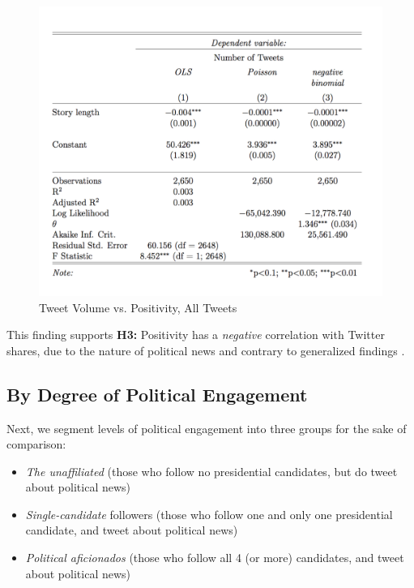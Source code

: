 \documentclass[letterpaper]{article}
\begin{document}
\begin{figure}[t!]  
\centering 
  \includegraphics[width=1.0\columnwidth]{story-len-table}  
  \caption{Tweet Volume vs. Positivity, All Tweets
    \label{fig:story-len-table}}
\end{figure}


This finding supports \textbf{H3:} Positivity has a \emph{negative} correlation with Twitter shares, due to the nature of political news and contrary to generalized findings \cite{berger2012makes}.

\subsection{By Degree of Political Engagement}

Next, we segment levels of political engagement into three groups for the sake of comparison:

\begin{itemize}
  \item \emph{The unaffiliated} (those who follow no presidential candidates, but do tweet about political news)
  \item \emph{Single-candidate} followers (those who follow one and only one presidential candidate, and tweet about political news)
  \item \emph{Political aficionados} (those who follow all 4 (or more) candidates, and tweet about political news)
\end{itemize}
\end{document}
